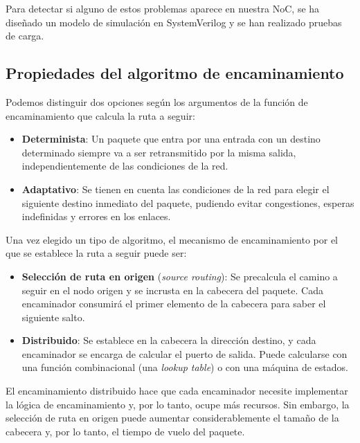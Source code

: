 \begin{recuadronoc}
    Para detectar si alguno de estos problemas aparece en nuestra NoC, se ha diseñado un modelo de simulación en SystemVerilog y se han realizado pruebas de carga.
\end{recuadronoc}

\subsection{Propiedades del algoritmo de encaminamiento}

Podemos distinguir dos opciones según los argumentos de la función de encaminamiento que calcula la ruta a seguir:
\begin{itemize}[noitemsep]
    \item \textbf{Determinista}: Un paquete que entra por una entrada con un destino determinado siempre va a ser retransmitido por la misma salida, independientemente de las condiciones de la red.
    \item \textbf{Adaptativo}: Se tienen en cuenta las condiciones de la red para elegir el siguiente destino inmediato del paquete, pudiendo evitar congestiones, esperas indefinidas y errores en los enlaces.
\end{itemize}

Una vez elegido un tipo de algoritmo, el mecanismo de encaminamiento por el que se establece la ruta a seguir puede ser:
\begin{itemize}
    \item \textbf{Selección de ruta en origen} (\textit{source routing}): Se precalcula el camino a seguir en el nodo origen y se incrusta en la cabecera del paquete. Cada encaminador consumirá el primer elemento de la cabecera para saber el siguiente salto.
    \item \textbf{Distribuido}: Se establece en la cabecera la dirección destino, y cada encaminador se encarga de calcular el puerto de salida. Puede calcularse con una función combinacional (una \textit{lookup table}) o con una máquina de estados.
\end{itemize}

El encaminamiento distribuido hace que cada encaminador necesite implementar la lógica de encaminamiento y, por lo tanto, ocupe más recursos. Sin embargo, la selección de ruta en origen puede aumentar considerablemente el tamaño de la cabecera y, por lo tanto, el tiempo de vuelo del paquete. 

